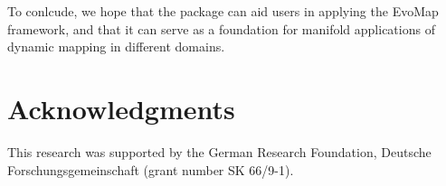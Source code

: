 \documentclass[article]{jss}
\begin{document}
To conlcude, we hope that the  package can aid users in applying the EvoMap framework, and that it can 
serve as a foundation for manifold applications of dynamic mapping in different domains.

\section*{Acknowledgments}

This research was supported by the German Research Foundation, Deutsche Forschungsgemeinschaft (grant number SK 66/9-1). 


\end{document}
